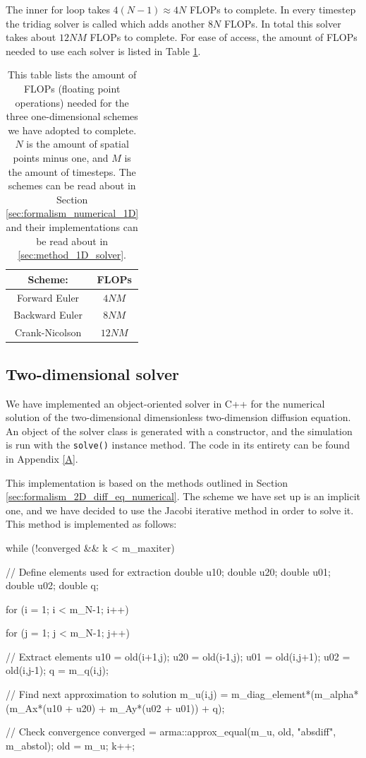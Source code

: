 \documentclass[reprint,english,notitlepage]{revtex4-1}  %
\begin{document}
The inner for loop takes $4(N-1) \approx 4N$ FLOPs to complete. In every timestep the tridiag solver is called which adds another $8N$ FLOPs. In total this solver takes about $12NM$ FLOPs to complete. For ease of access, the amount of FLOPs needed to use each solver is listed in Table \ref{table:FLOPs_1D}.

\begin{table}[H]
\centering
\caption{This table lists the amount of FLOPs (floating point operations) needed for the three one-dimensional schemes we have adopted to complete. $N$ is the amount of spatial points minus one, and $M$ is the amount of timesteps. The schemes can be read about in Section \ref{sec:formalism_numerical_1D} and their implementations can be read about in \ref{sec:method_1D_solver}.} \label{table:FLOPs_1D}
\begin{tabular}{|c|c|}
\hline 
Scheme: & FLOPs \\
\hline
Forward Euler & $4NM$ \\
\hline
Backward Euler & $8NM$ \\
\hline
Crank-Nicolson & $12NM$ \\
\hline
\end{tabular}
\end{table}

\subsection{Two-dimensional solver} \label{sec:method_2D_solver}

We have implemented an object-oriented solver in C++ for the numerical solution of the two-dimensional dimensionless two-dimension diffusion equation. An object of the solver class is generated with a constructor, and the simulation is run with the \verb+solve()+ instance method. The code in its entirety can be found in Appendix \ref{A}. 

This implementation is based on the methods outlined in Section \ref{sec:formalism_2D_diff_eq_numerical}. The scheme we have set up is an implicit one, and we have decided to use the Jacobi iterative method in order to solve it. This method is implemented as follows:

\begin{cpp}
while (!converged && k < m_maxiter){
  // Define elements used for extraction
  double u10;
  double u20;
  double u01;
  double u02;
  double q;

  for (i = 1; i < m_N-1; i++){
    for (j = 1; j < m_N-1; j++){
      // Extract elements
      u10 = old(i+1,j);
      u20 = old(i-1,j);
      u01 = old(i,j+1);
      u02 = old(i,j-1);
      q = m_q(i,j);

      // Find next approximation to solution
      m_u(i,j) = m_diag_element*(m_alpha*(m_Ax*(u10 + u20)
      		   + m_Ay*(u02 + u01)) + q);
    }
  }
  // Check convergence
  converged = arma::approx_equal(m_u, old, "absdiff", m_abstol);
  old = m_u;
  k++;
}
\end{cpp}
\end{document}
